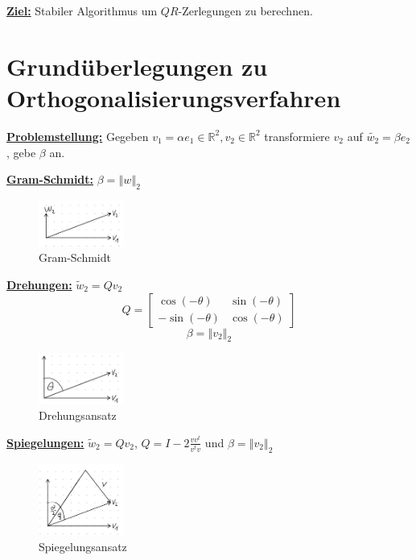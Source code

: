 \documentclass{book}
\def\R{\mathbb{R}}
\begin{document}
        \underline{\textbf{Ziel:}} Stabiler Algorithmus um $QR$-Zerlegungen zu berechnen.

    \section{Grundüberlegungen zu Orthogonalisierungsverfahren}

        \underline{\textbf{Problemstellung:}} Gegeben $v_1=\alpha e_1\in\R^2,v_2\in\R^2$ transformiere $v_2$ auf $\tilde{w_2}=\beta e_2$, gebe $\beta$ an.

        \underline{\textbf{Gram-Schmidt:}} $\beta=\left\Vert w \right\Vert_2$

        \begin{figure}[H]
            \centering
            \includegraphics[width=0.25\textwidth]{Bild005}
            \caption{Gram-Schmidt}
        \end{figure}


        \underline{\textbf{Drehungen:}} $\tilde{w}_2= Qv_2$
        \[Q=\begin{bmatrix}
            \cos(-\theta) & \sin(-\theta) \\
            -\sin(-\theta) & \cos(-\theta)
        \end{bmatrix}\]
        \[\beta = \left\Vert v_2 \right\Vert_2\]

        \begin{figure}[H]
            \centering
            \includegraphics[width=0.25\textwidth]{Bild006}
            \caption{Drehungsansatz}
        \end{figure}


        \underline{\textbf{Spiegelungen:}} $\tilde{w}_2=Qv_2$, $Q=I-2\frac{vv^t}{v^tv}$ und $\beta=\left\Vert v_2 \right\Vert_2$

        \begin{figure}[H]
            \centering
            \includegraphics[width=0.25\textwidth]{Bild007}
            \caption{Spiegelungsansatz}
        \end{figure}
\end{document}
